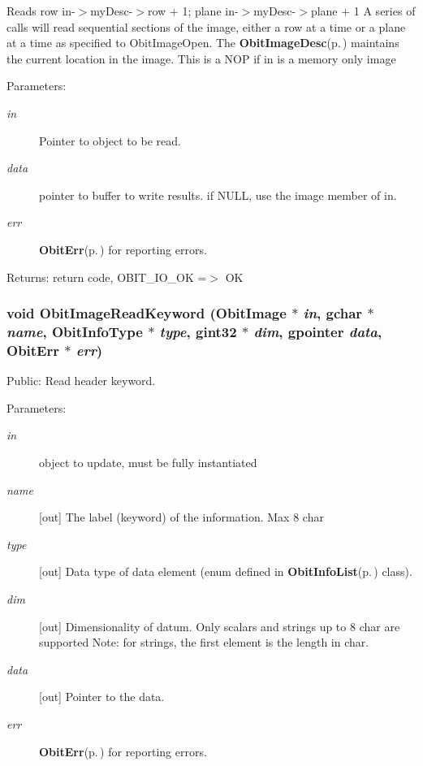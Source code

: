 Reads row in-$>$my\-Desc-$>$row + 1; plane in-$>$my\-Desc-$>$plane + 1 A series of calls will read sequential sections of the image, either a row at a time or a plane at a time as specified to Obit\-Image\-Open. The {\bf Obit\-Image\-Desc}{\rm (p.\,\pageref{structObitImageDesc})} maintains the current location in the image. This is a NOP if in is a memory only image \begin{Desc}
\item[Parameters:]
\begin{description}
\item[{\em in}]Pointer to object to be read. \item[{\em data}]pointer to buffer to write results. if NULL, use the image member of in. \item[{\em err}]{\bf Obit\-Err}{\rm (p.\,\pageref{structObitErr})} for reporting errors. \end{description}
\end{Desc}
\begin{Desc}
\item[Returns:]return code, OBIT\_\-IO\_\-OK =$>$ OK \end{Desc}
\subsubsection{\setlength{\rightskip}{0pt plus 5cm}void Obit\-Image\-Read\-Keyword ({\bf Obit\-Image} $\ast$ {\em in}, gchar $\ast$ {\em name}, Obit\-Info\-Type $\ast$ {\em type}, gint32 $\ast$ {\em dim}, gpointer {\em data}, {\bf Obit\-Err} $\ast$ {\em err})}\label{ObitImage_8c_a34}


Public: Read header keyword. 

\begin{Desc}
\item[Parameters:]
\begin{description}
\item[{\em in}]object to update, must be fully instantiated \item[{\em name}][out] The label (keyword) of the information. Max 8 char \item[{\em type}][out] Data type of data element (enum defined in {\bf Obit\-Info\-List}{\rm (p.\,\pageref{structObitInfoList})} class). \item[{\em dim}][out] Dimensionality of datum. Only scalars and strings up to 8 char are supported Note: for strings, the first element is the length in char. \item[{\em data}][out] Pointer to the data. \item[{\em err}]{\bf Obit\-Err}{\rm (p.\,\pageref{structObitErr})} for reporting errors. \end{description}
\end{Desc}

